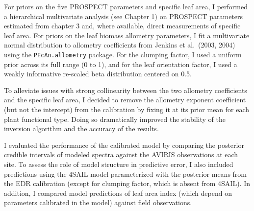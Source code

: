 For priors on the five PROSPECT parameters and specific leaf area, I performed a hierarchical multivariate analysis (see Chapter 1) on PROSPECT parameters estimated from chapter 3 and, where available, direct measurements of specific leaf area. 
For priors on the leaf biomass allometry parameters, I fit a multivariate normal distribution to allometry coefficients from Jenkins et al.~(2003, 2004) using the \texttt{PEcAn.allometry} package. \nocite{jenkins_2003_allom,jenkins_2004_allom} 
For the clumping factor, I used a uniform prior across its full range (0 to 1), and for the leaf orientation factor, I used a weakly informative re-scaled beta distribution centered on 0.5.

To alleviate issues with strong collinearity between the two allometry coefficients and the specific leaf area, I decided to remove the allometry exponent coefficient (but not the intercept) from the calibration by fixing it at its prior mean for each plant functional type.
Doing so dramatically improved the stability of the inversion algorithm and the accuracy of the results.

I evaluated the performance of the calibrated model by comparing the posterior credible intervals of modeled spectra against the AVIRIS observations at each site.
To assess the role of model structure in predictive error, I also included predictions using the 4SAIL model parameterized with the posterior means from the EDR calibration (except for clumping factor, which is absent from 4SAIL).
In addition, I compared model predictions of leaf area index (which depend on parameters calibrated in the model) against field observations.
